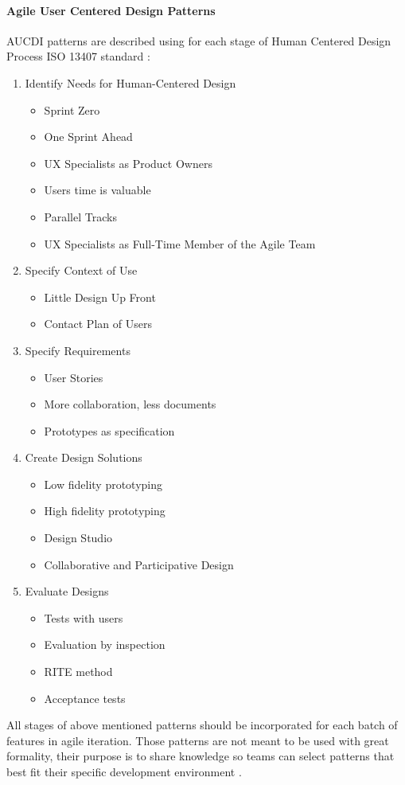 \documentclass{article}
\begin{document}
\paragraph{Agile User Centered Design Patterns}
AUCDI patterns are described using for each stage of Human Centered Design Process ISO 13407 standard \cite{bertholdo2014agile}\cite{bertholdo2016agile} :
\begin{enumerate}
 \item Identify Needs for Human-Centered Design
 \begin{itemize}
     \item Sprint Zero
     \item One Sprint Ahead
     \item UX Specialists as Product Owners 
     \item Users time is valuable
     \item Parallel Tracks
     \item UX Specialists as Full-Time Member of the Agile Team
 \end{itemize}
 \item Specify Context of Use
 \begin{itemize}
     \item Little Design Up Front
     \item Contact Plan of Users
 \end{itemize}
 \item Specify Requirements
 \begin{itemize}
     \item User Stories
     \item More collaboration, less documents
     \item Prototypes as specification
 \end{itemize}
 \item Create Design Solutions
 \begin{itemize}
     \item Low fidelity prototyping
     \item High fidelity prototyping
     \item Design Studio
     \item Collaborative and Participative Design
 \end{itemize}
 \item Evaluate Designs
 \begin{itemize}
     \item Tests with users
     \item Evaluation by inspection
     \item RITE method
     \item Acceptance tests
 \end{itemize}
\end{enumerate}
All stages of above mentioned patterns should be incorporated for each batch of features in agile iteration. Those patterns are not meant to be used with great formality, their purpose is to share knowledge so teams can select patterns that best fit their specific development environment  \cite{bertholdo2016agile}.
\end{document}
